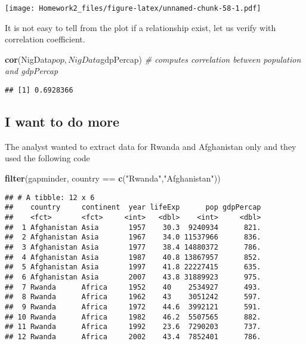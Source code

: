 \documentclass[]{article}
\newenvironment{Shaded}{\begin{snugshade}}{\end{snugshade}}
\newcommand{\KeywordTok}[1]{\textcolor[rgb]{0.13,0.29,0.53}{\textbf{{#1}}}}
\newcommand{\StringTok}[1]{\textcolor[rgb]{0.31,0.60,0.02}{{#1}}}
\newcommand{\CommentTok}[1]{\textcolor[rgb]{0.56,0.35,0.01}{\textit{{#1}}}}
\newcommand{\NormalTok}[1]{{#1}}
\begin{document}
\texttt{[image: Homework2\_files/figure-latex/unnamed-chunk-58-1.pdf]}

It is not easy to tell from the plot if a relationship exist, let us
verify with correlation coefficient.

\begin{Shaded}
\begin{Highlighting}[]
\KeywordTok{cor}\NormalTok{(NigData$pop,NigData$gdpPercap) }\CommentTok{# computes correlation between population and gdpPercap}
\end{Highlighting}
\end{Shaded}

\begin{verbatim}
## [1] 0.6928366
\end{verbatim}

\subsection{I want to do more}\label{i-want-to-do-more}

The analyst wanted to extract data for Rwanda and Afghanistan only and
they used the following code

\begin{Shaded}
\begin{Highlighting}[]
 \KeywordTok{filter}\NormalTok{(gapminder, country ==}\StringTok{ }\KeywordTok{c}\NormalTok{(}\StringTok{"Rwanda"}\NormalTok{,}\StringTok{"Afghanistan"}\NormalTok{))}
\end{Highlighting}
\end{Shaded}

\begin{verbatim}
## # A tibble: 12 x 6
##    country     continent  year lifeExp      pop gdpPercap
##    <fct>       <fct>     <int>   <dbl>    <int>     <dbl>
##  1 Afghanistan Asia       1957    30.3  9240934      821.
##  2 Afghanistan Asia       1967    34.0 11537966      836.
##  3 Afghanistan Asia       1977    38.4 14880372      786.
##  4 Afghanistan Asia       1987    40.8 13867957      852.
##  5 Afghanistan Asia       1997    41.8 22227415      635.
##  6 Afghanistan Asia       2007    43.8 31889923      975.
##  7 Rwanda      Africa     1952    40    2534927      493.
##  8 Rwanda      Africa     1962    43    3051242      597.
##  9 Rwanda      Africa     1972    44.6  3992121      591.
## 10 Rwanda      Africa     1982    46.2  5507565      882.
## 11 Rwanda      Africa     1992    23.6  7290203      737.
## 12 Rwanda      Africa     2002    43.4  7852401      786.
\end{verbatim}
\end{document}
